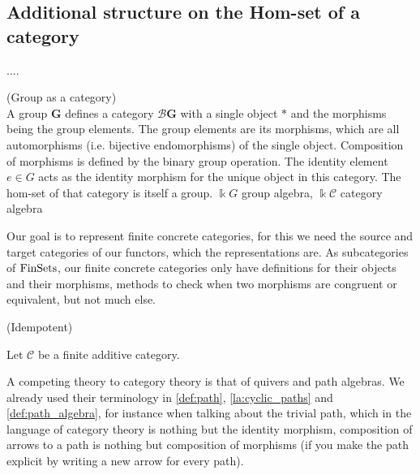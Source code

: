 
\subsection{Additional structure on the Hom-set of a category}

....

\begin{example}{(Group as a category)}\\
\noindent A group $\mathbf{G}$ defines a category $\mathcal{B}\mathbf{G}$ with a single object $\ast$ and the morphisms being the group elements. The group elements are its morphisms, which are
all automorphisms (i.e. bijective endomorphisms) of the single object. Composition of morphisms is defined by the binary group operation.
The identity element $e \in G$ acts as the identity morphism for the unique object in this category. The hom-set of that category is itself
a group.
$\Bbbk G$ group algebra, $\Bbbk \mathcal{C}$ category algebra
\end{example}

Our goal is to represent finite concrete categories, for this we need the source and target categories of our functors, which the
representations are.
As subcategories of $\textup{FinSets}$, our finite concrete categories only have definitions for their objects and their
morphisms, methods to check when two morphisms are congruent or equivalent, but not much else.


\begin{definition}{(Idempotent)}

\end{definition}

\begin{theorem}
Let $\mathcal{C}$ be a finite additive category.
\end{theorem}











A competing theory to category theory is that of quivers and path algebras. We already used their terminology in
\ref{def:path}, \ref{la:cyclic_paths} and \ref{def:path_algebra}, for instance when talking about the trivial path,
which in the language of category theory is nothing but the identity morphism, composition of arrows to a path is nothing but
composition of morphisms (if you make the path explicit by writing a new arrow for every path).

